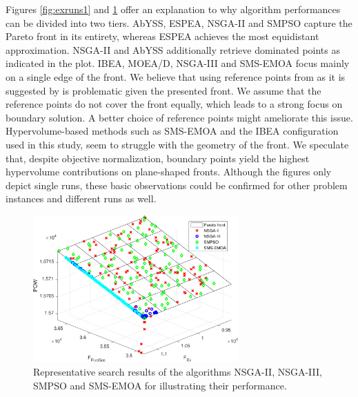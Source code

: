 Figures \ref{fig:exruns1} and \ref{fig:exruns2} offer an explanation to why algorithm performances can be divided into two tiers. AbYSS, ESPEA, NSGA-II and SMPSO capture the Pareto front in its entirety, whereas ESPEA achieves the most equidistant approximation. NSGA-II and AbYSS additionally retrieve dominated points as indicated in the plot. IBEA, MOEA/D, NSGA-III and SMS-EMOA focus mainly on a single edge of the front. We believe that using reference points from \cite{nbi} as it is suggested by \cite{moead2009,nsga3part1} is problematic given the presented front. We assume that the reference points do not cover the front equally, which leads to a strong focus on boundary solution. A better choice of reference points might ameliorate this issue. Hypervolume-based methods such as SMS-EMOA and the IBEA configuration used in this study, seem to struggle with the geometry of the front. We speculate that, despite objective normalization, boundary points yield the highest hypervolume contributions on plane-shaped fronts. Although the figures only depict single runs, these basic observations could be confirmed for other problem instances and different runs as well.

\begin{figure}
\centering
\includegraphics[width=0.7\textwidth]{figures/example2_cropped.pdf}
\caption{Representative search results of the algorithms NSGA-II, NSGA-III, SMPSO and SMS-EMOA for illustrating their performance.}
\label{fig:exruns2}
\end{figure}

